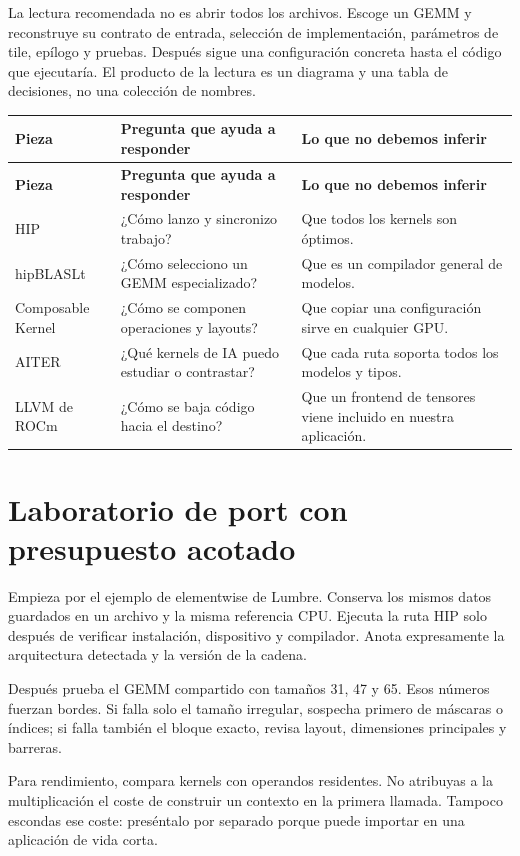 \documentclass[12pt,a4paper,oneside]{report}
\begin{document}
La lectura recomendada no es abrir todos los archivos. Escoge un GEMM y reconstruye su contrato de entrada, selección de implementación, parámetros de tile, epílogo y pruebas. Después sigue una configuración concreta hasta el código que ejecutaría. El producto de la lectura es un diagrama y una tabla de decisiones, no una colección de nombres.

{\small
\begin{longtable}{@{}P{0.28\textwidth}P{0.32\textwidth}P{0.34\textwidth}@{}}
\toprule
\textbf{Pieza} & \textbf{Pregunta que ayuda a responder} & \textbf{Lo que no debemos inferir}\\
\midrule
\endfirsthead
\toprule
\textbf{Pieza} & \textbf{Pregunta que ayuda a responder} & \textbf{Lo que no debemos inferir}\\
\midrule
\endhead
HIP & ¿Cómo lanzo y sincronizo trabajo? & Que todos los kernels son óptimos.\\
hipBLASLt & ¿Cómo selecciono un GEMM especializado? & Que es un compilador general de modelos.\\
Composable Kernel & ¿Cómo se componen operaciones y layouts? & Que copiar una configuración sirve en cualquier GPU.\\
AITER & ¿Qué kernels de IA puedo estudiar o contrastar? & Que cada ruta soporta todos los modelos y tipos.\\
LLVM de ROCm & ¿Cómo se baja código hacia el destino? & Que un frontend de tensores viene incluido en nuestra aplicación.\\
\bottomrule
\end{longtable}
}
\section{Laboratorio de port con presupuesto acotado}
Empieza por el ejemplo de elementwise de Lumbre. Conserva los mismos datos guardados en un archivo y la misma referencia CPU. Ejecuta la ruta HIP solo después de verificar instalación, dispositivo y compilador. Anota expresamente la arquitectura detectada y la versión de la cadena.

Después prueba el GEMM compartido con tamaños 31, 47 y 65. Esos números fuerzan bordes. Si falla solo el tamaño irregular, sospecha primero de máscaras o índices; si falla también el bloque exacto, revisa layout, dimensiones principales y barreras.

Para rendimiento, compara kernels con operandos residentes. No atribuyas a la multiplicación el coste de construir un contexto en la primera llamada. Tampoco escondas ese coste: preséntalo por separado porque puede importar en una aplicación de vida corta.
\end{document}
